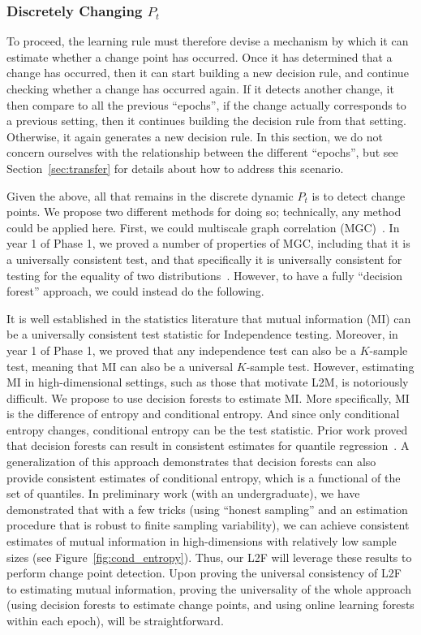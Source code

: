 \documentclass{article}
\begin{document}
\subsubsection{Discretely Changing $P_t$}

To proceed, the learning rule must therefore devise a mechanism by which it can estimate whether a change point has occurred. Once it has determined that a change has occurred, then it can start building a new decision rule, and continue checking whether a change has occurred again.  If it detects another change, it then compare to all the previous ``epochs'', if the change actually corresponds to a previous setting, then it continues building the decision rule from that setting.  Otherwise, it again generates a new decision rule. In this section, we do not concern ourselves with the relationship between the different ``epochs'', but see Section~\ref{sec:transfer} for details about how to address this scenario.   

Given the above, all that remains in the discrete dynamic $P_t$ is to detect change points. We propose two different methods for doing so; technically, any method could be applied here. First, we could multiscale graph correlation (MGC)~\cite{mgc1, mgc2}.  In year 1 of Phase 1, we proved a number of properties of MGC, including that it is a universally consistent test, and that specifically it is universally consistent for testing for the equality of two distributions~\cite{exact}.  However, to have a fully ``decision forest'' approach, we could instead do the following. 

It is well established in the statistics literature that mutual information (MI) can be a universally consistent test statistic for Independence testing.  Moreover, in year 1 of Phase 1, we proved that any independence test can also be a $K$-sample test, meaning that MI can also be a universal $K$-sample test. However, estimating MI in high-dimensional settings, such as those that motivate L2M, is notoriously difficult.  We propose to use decision forests to estimate MI.  More specifically,  MI is the difference of entropy and conditional entropy.  And since only conditional entropy changes, conditional entropy can be the test statistic.  Prior work proved that decision forests can result in consistent estimates for quantile regression~\cite{Meinhasser2006}.  A generalization of this approach demonstrates that decision forests can also provide consistent estimates of conditional entropy, which is a functional of the set of quantiles.  In preliminary work (with an undergraduate), we have demonstrated that with a few tricks (using ``honest sampling'' and an estimation procedure that is robust to finite sampling variability), we can achieve consistent estimates of mutual information in high-dimensions with relatively low sample sizes (see Figure~\ref{fig:cond_entropy}). Thus, our L2F will leverage these results to perform change point detection. Upon proving the universal consistency of L2F to estimating mutual information, proving the universality of the whole approach (using decision forests to estimate change points, and using online learning forests within each epoch), will be straightforward. 
\end{document}
